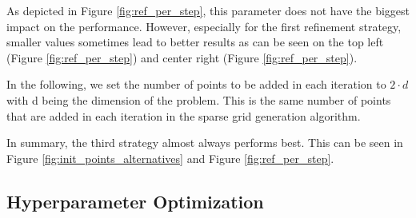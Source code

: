 As depicted in Figure \ref{fig:ref_per_step}, this parameter does not have the biggest impact on the performance. However, especially for the first refinement strategy, smaller values sometimes lead to better results as can be seen on the top left (Figure \ref{fig:ref_per_step}) and center right (Figure \ref{fig:ref_per_step}). \newline 

In the following, we set the number of points to be added in each iteration to $ 2 \cdot d $ with d being the dimension of the problem. This is the same number of points that are added in each iteration in the sparse grid generation algorithm. \newline 

In summary, the third strategy almost always performs best. This can be seen in Figure \ref{fig:init_points_alternatives} and Figure \ref{fig:ref_per_step}. 


\subsection{Hyperparameter Optimization}


